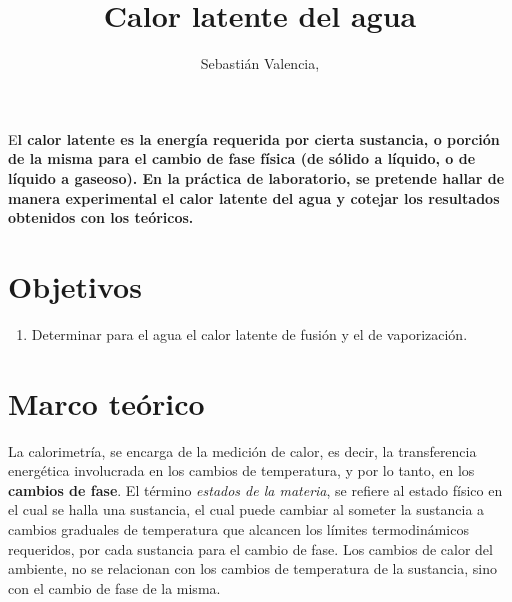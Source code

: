 \documentclass[DIV=calc, paper=a4, fontsize=11pt, twocolumn, spanish]{scrartcl}	 %
\title{Calor latente del agua} %
\author{Sebastián Valencia, } %
\date{} %
\newcommand{\initial}[1]{ %
\lettrine[lines=3,lhang=0.3,nindent=0em]{
\color{DarkGoldenrod}
{\textsf{#1}}}{}}
\begin{document}
\maketitle %

\thispagestyle{fancy} %


\initial{E}\textbf{l calor latente es la energía requerida por cierta sustancia, o porción de la misma para el cambio de fase física (de sólido a líquido, o de líquido a gaseoso). En la práctica de laboratorio, se pretende hallar de manera experimental el calor latente del agua y cotejar los resultados obtenidos con los teóricos.}


\section*{Objetivos}

\begin{enumerate}
\item Determinar para el agua el calor latente de fusión y el de vaporización.
\end{enumerate}


\section*{Marco teórico}

La calorimetría, se encarga de la medición de calor, es decir, la transferencia energética involucrada en los cambios de temperatura, y por lo tanto, en los \textbf{cambios de fase}. El término \textit{estados de la materia}, se refiere al estado físico en el cual se halla una sustancia, el cual puede cambiar al someter la sustancia a cambios graduales de temperatura que alcancen los límites termodinámicos requeridos, por cada sustancia para el cambio de fase. Los cambios de calor del ambiente, no se relacionan con los cambios de temperatura de la sustancia, sino con el cambio de fase de la misma.\\
\end{document}
